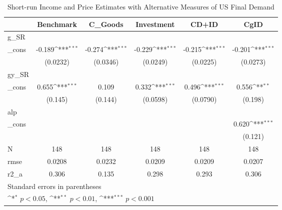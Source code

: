 \begin{table}[htbp]\centering
\def\sym#1{\ifmmode^{#1}\else\(^{#1}\)\fi}
\caption{Short-run Income and Price Estimates with Alternative Measures of US Final Demand}
\begin{tabular}{l*{5}{c}}
\hline\hline
          &\multicolumn{1}{c}{Benchmark}&\multicolumn{1}{c}{C\_Goods}&\multicolumn{1}{c}{Investment}&\multicolumn{1}{c}{CD+ID}&\multicolumn{1}{c}{CgID}\\
\hline
g\_SR      &                  &                  &                  &                  &                  \\
\_cons    &   -0.189\sym{***}&   -0.274\sym{***}&   -0.229\sym{***}&   -0.215\sym{***}&   -0.201\sym{***}\\
          & (0.0232)         & (0.0346)         & (0.0249)         & (0.0225)         & (0.0273)         \\
[1em]
gy\_SR     &                  &                  &                  &                  &                  \\
\_cons    &    0.655\sym{***}&    0.109         &    0.332\sym{***}&    0.496\sym{***}&    0.556\sym{**} \\
          &  (0.145)         &  (0.144)         & (0.0598)         & (0.0790)         &  (0.198)         \\
[1em]
alp       &                  &                  &                  &                  &                  \\
\_cons    &                  &                  &                  &                  &    0.620\sym{***}\\
          &                  &                  &                  &                  &  (0.121)         \\
\hline
N         &      148         &      148         &      148         &      148         &      148         \\
rmse      &   0.0208         &   0.0232         &   0.0209         &   0.0209         &   0.0207         \\
r2\_a      &    0.306         &    0.135         &    0.298         &    0.293         &    0.306         \\
\hline\hline
\multicolumn{6}{l}{\footnotesize Standard errors in parentheses}\\
\multicolumn{6}{l}{\footnotesize \sym{*} \(p<0.05\), \sym{**} \(p<0.01\), \sym{***} \(p<0.001\)}\\
\end{tabular}
\end{table}
